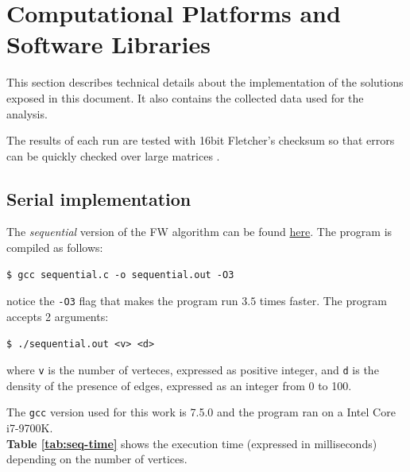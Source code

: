 \section{Computational Platforms and Software Libraries}
This section describes technical details about the implementation of the solutions exposed in this document. It also contains
the collected data used for the analysis.

The results of each run are tested with 16bit Fletcher's checksum so that errors can be quickly checked over large matrices \cite{fletcher}.
\subsection{Serial implementation}
The \emph{sequential} version of the FW algorithm can be found \href{https://github.com/firaja/Parallel-FloydWarshall/blob/master/sequential.c}{here}. 
The program is compiled as follows:
\begin{lstlisting}[basicstyle=\footnotesize\ttfamily]
$ gcc sequential.c -o sequential.out -O3
\end{lstlisting}

notice the \texttt{-O3} flag that makes the program run $3.5$ times faster.
The program accepts 2 arguments:
\begin{lstlisting}[basicstyle=\footnotesize\ttfamily]
$ ./sequential.out <v> <d>
\end{lstlisting}
where \texttt{v} is the number of verteces, expressed as positive integer, and \texttt{d} is the density of the presence of edges, expressed as an integer from 0 to 100.
\par
The \texttt{gcc} version used for this work is 7.5.0 and the program ran on a Intel Core i7-9700K. \\
\textbf{Table \ref*{tab:seq-time}} shows the execution time (expressed in milliseconds) depending on the number of vertices.



